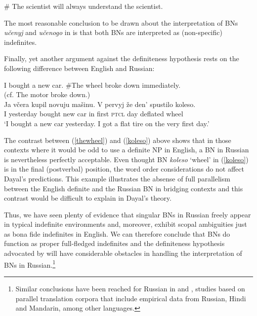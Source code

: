 \documentclass[output=paper,colorlinks,citecolor=brown]{langscibook}
\begin{document}
\ea \# The scientist will always understand the scientist. 
\z


The most reasonable conclusion to be drawn about the interpretation of BNs \textit{u\v{c}enyj} and \textit{u\v{c}enogo} in  is that both BNs are interpreted as (non-specific) indefinites. 

Finally, yet another argument against the definiteness hypothesis rests on the following difference between English and Russian: 

\ea	
\ea \label{thewheel} {I bought a new car.  $\#$The wheel} broke down immediately. \\
		{(cf. The motor broke down.)} \\
\ex \label{koleso} \gll Ja 	v\v{c}era 				kupil 			novuju 	ma\v{s}inu.  V pervyj 	\v{z}e	den' spustilo koleso.\\
		I 			yesterday 	bought 	new 				car 			 in first 	\textsc{ptcl}  day deflated wheel \\
  \glt `I bought a new car yesterday. I got a flat tire on the very first day.'
\z
\z

\noindent The contrast between (\ref{thewheel}) and (\ref{koleso}) above shows that in those contexts where it would be odd to use a definite NP in English, a BN in Russian is nevertheless perfectly acceptable. Even thought BN \textit{koleso} `wheel' in (\ref{koleso}) is in the final (postverbal) position, the word order considerations do not affect Dayal's predictions. This example illustrates the absense of full parallelism between the English definite and the Russian BN in bridging contexts and this contrast would be difficult to explain in Dayal's theory. 

Thus, we have seen plenty of evidence that singular BNs in Russian freely appear in typical indefinite environments and, moreover, exhibit scopal ambiguities just as bona fide indefinites in English. We can therefore conclude that BNs do function as proper full-fledged indefinites and the definiteness hypothesis advocated by \citet{dayal04} will have considerable obstacles in handling the interpretation of BNs in Russian.\footnote{Similar conclusions have been reached for Russian in \citet{Borik.etal2025, Liu.etal2023} and \citet{liusalt}, studies based on parallel translation corpora that include empirical data from Russian, Hindi and Mandarin, among other languages.}
\end{document}

